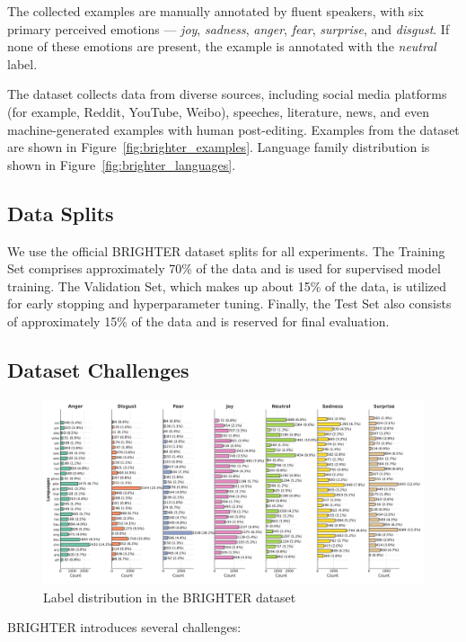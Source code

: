 \documentclass[a4paper,12pt]{extarticle}
\begin{document}
The collected examples are manually annotated by fluent speakers, 
with six primary perceived emotions — \textit{joy}, \textit{sadness}, \textit{anger}, \textit{fear}, \textit{surprise}, and \textit{disgust}.
If none of these emotions are present, the example is annotated with the \textit{neutral} label.

The dataset collects data from diverse sources, including social media platforms (for example, Reddit, YouTube, Weibo), speeches, literature, news, and even machine-generated examples with human post-editing. 
Examples from the dataset are shown in Figure~\ref{fig:brighter_examples}.
Language family distribution is shown in Figure~\ref{fig:brighter_languages}.

\subsection{Data Splits}
We use the official BRIGHTER dataset splits for all experiments. The Training Set comprises approximately 70\% of the data and is used for supervised model training. The Validation Set, which makes up about 15\% of the data, is utilized for early stopping and hyperparameter tuning. Finally, the Test Set also consists of approximately 15\% of the data and is reserved for final evaluation.

\subsection{Dataset Challenges}

\begin{figure}[h]
    \centering
    \includegraphics[width=1\textwidth]{brighter_label_distribution.png}
    \caption{Label distribution in the BRIGHTER dataset}
    \label{fig:brighter_label_distribution}
\end{figure}

BRIGHTER introduces several challenges:
\end{document}
